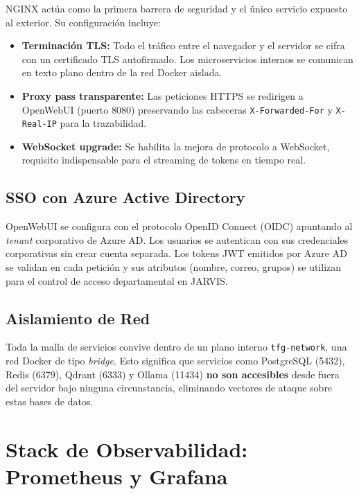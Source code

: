 NGINX actúa como la primera barrera de seguridad y el único servicio expuesto al exterior. Su configuración incluye:

\begin{itemize}
    \item \textbf{Terminación TLS:} Todo el tráfico entre el navegador y el servidor se cifra con un certificado TLS autofirmado. Los microservicios internos se comunican en texto plano dentro de la red Docker aislada.
    \item \textbf{Proxy pass transparente:} Las peticiones HTTPS se redirigen a OpenWebUI (puerto 8080) preservando las cabeceras \texttt{X-Forwarded-For} y \texttt{X-Real-IP} para la trazabilidad.
    \item \textbf{WebSocket upgrade:} Se habilita la mejora de protocolo a WebSocket, requisito indispensable para el streaming de tokens en tiempo real.
\end{itemize}

\subsection{SSO con Azure Active Directory}

OpenWebUI se configura con el protocolo OpenID Connect (OIDC) apuntando al \textit{tenant} corporativo de Azure AD. Los usuarios se autentican con sus credenciales corporativas sin crear cuenta separada. Los tokens JWT emitidos por Azure AD se validan en cada petición y sus atributos (nombre, correo, grupos) se utilizan para el control de acceso departamental en JARVIS.

\subsection{Aislamiento de Red}

Toda la malla de servicios convive dentro de un plano interno \texttt{tfg-network}, una red Docker de tipo \textit{bridge}. Esto significa que servicios como PostgreSQL (5432), Redis (6379), Qdrant (6333) y Ollama (11434) \textbf{no son accesibles} desde fuera del servidor bajo ninguna circunstancia, eliminando vectores de ataque sobre estas bases de datos.

\section{Stack de Observabilidad: Prometheus y Grafana}
\label{sec:observabilidad-impl}

